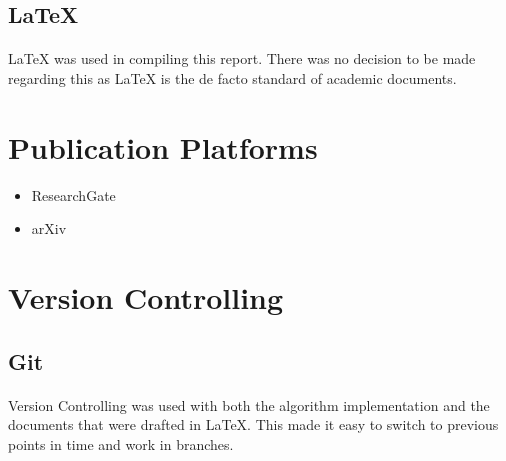 \subsection{LaTeX}

\paragraph{}
LaTeX was used in compiling this report. There was no decision to be made regarding this as LaTeX is the de facto standard of academic documents. 

\section{Publication Platforms}

\begin{itemize}
    \item ResearchGate
    \item arXiv
\end{itemize}

\section{Version Controlling}

\subsection{Git}

\paragraph{}
Version Controlling was used with both the algorithm implementation and the documents that were drafted in LaTeX. This made it easy to switch to previous points in time and work in branches. 